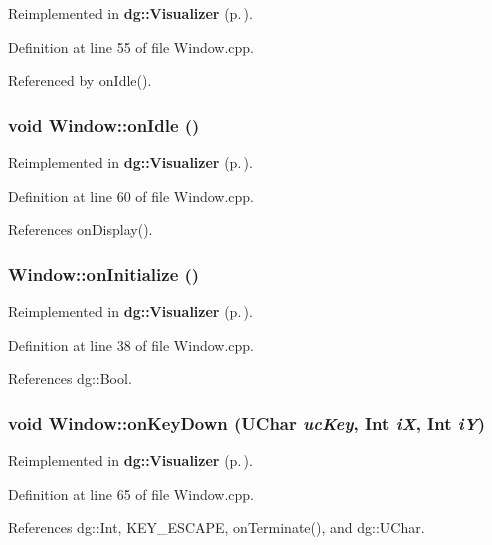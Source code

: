 Reimplemented in {\bf dg::Visualizer} {\rm (p.\,\pageref{classdg_1_1Visualizer_a5})}.

Definition at line 55 of file Window.cpp.

Referenced by on\-Idle().
\subsubsection{\setlength{\rightskip}{0pt plus 5cm}void Window::on\-Idle ()\hspace{0.3cm}{\tt  [virtual]}}\label{classdg_1_1Window_a17}




Reimplemented in {\bf dg::Visualizer} {\rm (p.\,\pageref{classdg_1_1Visualizer_a6})}.

Definition at line 60 of file Window.cpp.

References on\-Display().
\subsubsection{ Window::on\-Initialize ()\hspace{0.3cm}{\tt  [virtual]}}\label{classdg_1_1Window_a2}




Reimplemented in {\bf dg::Visualizer} {\rm (p.\,\pageref{classdg_1_1Visualizer_a3})}.

Definition at line 38 of file Window.cpp.

References dg::Bool.
\subsubsection{\setlength{\rightskip}{0pt plus 5cm}void Window::on\-Key\-Down ({\bf UChar} {\em uc\-Key}, {\bf Int} {\em i\-X}, {\bf Int} {\em i\-Y})\hspace{0.3cm}{\tt  [virtual]}}\label{classdg_1_1Window_a10}




Reimplemented in {\bf dg::Visualizer} {\rm (p.\,\pageref{classdg_1_1Visualizer_a7})}.

Definition at line 65 of file Window.cpp.

References dg::Int, KEY\_\-ESCAPE, on\-Terminate(), and dg::UChar.

